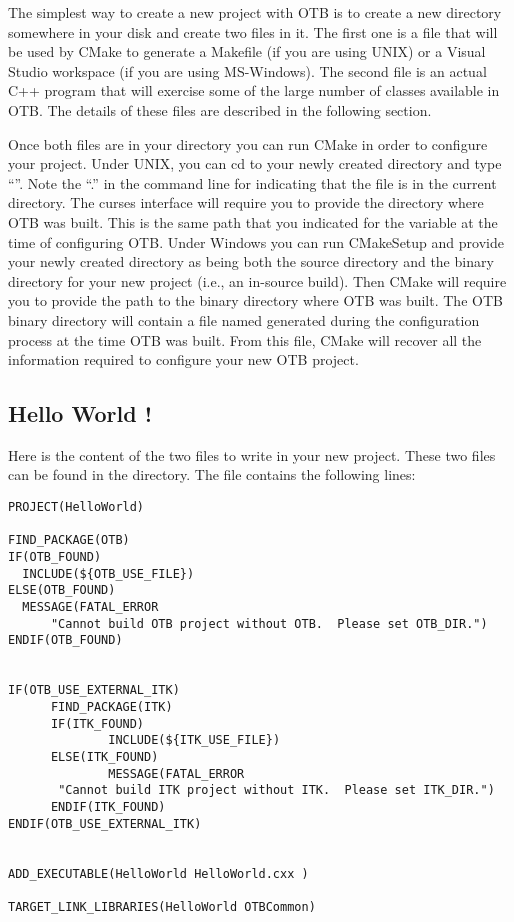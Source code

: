 The simplest way to create a new project with OTB is to create a new directory
somewhere in your disk and create two files in it. The first one is a
 file that will be used by CMake to generate a Makefile
(if you are using UNIX) or a Visual Studio workspace (if you are using
MS-Windows).  The second file is an actual C++ program that will exercise
some of the large number of classes available in OTB. The details of these files
are described in the following section.

Once both files are in your directory you can run CMake in order to configure
your project. Under UNIX, you can cd to your newly created directory
and type ``''. Note the ``.'' in the command line for indicating
that the  file is in the current directory. The
curses interface will require you to provide the directory where OTB
was built. This is the same path that you indicated for the
 variable at the time of configuring OTB. Under
Windows you can run CMakeSetup and provide your newly created
directory as being both the source directory and the binary directory for
your new project (i.e., an in-source build). Then CMake will require you to
provide the path to the binary directory where OTB was built. The OTB binary
directory will contain a file named  generated during the
configuration process at the time OTB was built.  From this file, CMake will
recover all the information required to configure your new OTB project.

 
\subsection{Hello World !}
\label{sec:HelloWorldOTB}



Here is the content of the two files to write in your new project. These two
files can be found in the  directory. The
 file contains the following lines:

\small
\begin{verbatim}
PROJECT(HelloWorld)

FIND_PACKAGE(OTB)
IF(OTB_FOUND)
  INCLUDE(${OTB_USE_FILE})
ELSE(OTB_FOUND)
  MESSAGE(FATAL_ERROR
      "Cannot build OTB project without OTB.  Please set OTB_DIR.")
ENDIF(OTB_FOUND)

    
IF(OTB_USE_EXTERNAL_ITK)
      FIND_PACKAGE(ITK)
      IF(ITK_FOUND)
              INCLUDE(${ITK_USE_FILE})
      ELSE(ITK_FOUND)
              MESSAGE(FATAL_ERROR
       "Cannot build ITK project without ITK.  Please set ITK_DIR.")
      ENDIF(ITK_FOUND)
ENDIF(OTB_USE_EXTERNAL_ITK)


ADD_EXECUTABLE(HelloWorld HelloWorld.cxx )

TARGET_LINK_LIBRARIES(HelloWorld OTBCommon)
\end{verbatim}

